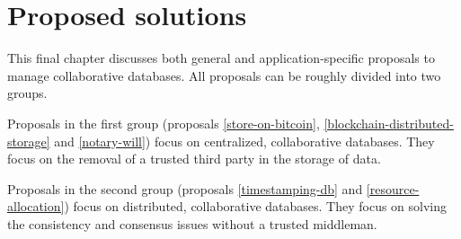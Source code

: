 \chapter{Proposed solutions}

\iffalse
- general introduction of the several propsed methods, maybe putting them in two categories
\fi

This final chapter discusses both general and application-specific proposals to manage collaborative databases. All proposals can be roughly divided into two groups. 

Proposals in the first group (proposals \ref{store-on-bitcoin}, \ref{blockchain-distributed-storage} and \ref{notary-will}) focus on centralized, collaborative databases. They focus on the removal of a trusted third party in the storage of data.

Proposals in the second group (proposals \ref{timestamping-db} and \ref{resource-allocation}) focus on distributed, collaborative databases. They focus on solving the consistency and consensus issues without a trusted middleman. 


\newpage

\newpage

\newpage

\newpage

\newpage

\iffalse
other examples to discuss:

- resource allocation system based on namecoin
\fi